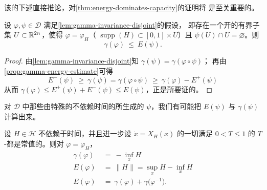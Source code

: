 该\trhLemma{}的下述直接推论，对\cref{thm:energy-dominates-capacity}的证明将%
是至关重要的。

\begin{proposition}\label{prop:gamma-le-energy}
设 $\varphi,\psi\in\mathcal{D}$ 满足\cref{lem:gamma-invariance-disjoint}的假设，%
即存在一个开的有界子集 $U\subset\mathbb{R}^{2n}$，使得 $\varphi=\varphi_{H}$（%
$\operatorname{supp}(H)\subset[0,1]\times U$）且 $\psi(U)\cap U=\varnothing$。则
\[
\gamma(\varphi)\ \leq\ E(\psi).
\]
\end{proposition}

\begin{proof}
由\cref{lem:gamma-invariance-disjoint}知 $\gamma(\psi)=\gamma(\varphi\circ\psi)$；%
再由\cref{prop:gamma-energy-estimate}可得
\[
E^{-}(\psi)\ \geq\ \gamma(\psi)=\gamma(\varphi\circ\psi)\ \geq\ \gamma(\varphi)-E^{+}(\psi)
\]
从而 $\gamma(\varphi)\leq E^{+}(\psi)+E^{-}(\psi)\leq E(\psi)$，正是所要证的。
\end{proof}

对 $\mathcal{D}$ 中那些由特殊的不依赖时间的\trHamiltonianFunction{}所生成的%
$\psi$，我们有可能把\trEnergy{} $E(\psi)$ 与 $\gamma(\psi)$ 计算出来。

\begin{proposition}\label{prop:time-independent-energy}
设 $H\in\mathcal{H}$ 不依赖于时间，并且进一步设 $\dot{x}=X_{H}(x)$ 的一切满足%
$0<T\leq1$ 的 $T$-\trPeriodicSolution{}都是常值的。则对 $\varphi=\varphi_{H}$，
\begin{align*}
\gamma(\varphi)\ &=\ -\inf_{x}H\\
E(\varphi)\ &=\ \lVert H\rVert=\sup_{x}H-\inf_{x}H\\
E(\varphi)\ &=\ \gamma(\varphi)+\gamma\bigl(\varphi^{-1}\bigr).
\end{align*}
\end{proposition}

